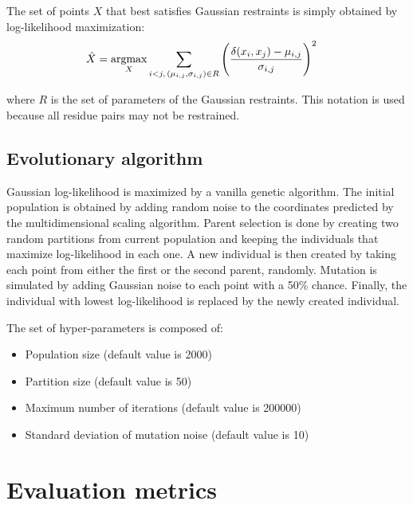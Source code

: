         The set of points $X$ that best satisfies Gaussian restraints is simply
        obtained by log-likelihood maximization:
        \begin{align}
            \hat{X} & = \operatorname*{argmax}_{X} \sum\limits_{i < j ,\, (\mu_{i,j}, \sigma_{i,j}) \in R}
                \Bigg(\frac{\delta(x_i, x_j) - \mu_{i,j}}{\sigma_{i,j}}\Bigg)^2
        \end{align}

        where $R$ is the set of parameters of the Gaussian restraints. This notation is used
        because all residue pairs may not be restrained.


    \subsection{Evolutionary algorithm}

        Gaussian log-likelihood is maximized by a vanilla genetic algorithm.
        The initial population is obtained by adding random noise to the coordinates
        predicted by the multidimensional scaling algorithm.
        Parent selection is done by creating two random partitions from current population
        and keeping the individuals that maximize log-likelihood in each one.
        A new individual is then created by taking each point from either the first
        or the second parent, randomly. Mutation is simulated by adding Gaussian noise
        to each point with a 50\% chance.
        Finally, the individual with lowest log-likelihood is replaced by the
        newly created individual.

        The set of hyper-parameters is composed of:
        \begin{itemize}
            \item Population size (default value is 2000)
            \item Partition size (default value is 50)
            \item Maximum number of iterations (default value is 200000)
            \item Standard deviation of mutation noise (default value is 10)
        \end{itemize}

    \section{Evaluation metrics}

